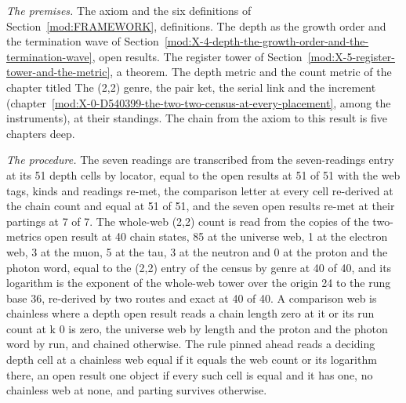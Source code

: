 \begin{chproof}
\textit{The premises.} The axiom and the six definitions of Section~\ref{mod:FRAMEWORK}, definitions. The depth as the growth order and the termination wave of Section~\ref{mod:X-4-depth-the-growth-order-and-the-termination-wave}, open results. The register tower of Section~\ref{mod:X-5-register-tower-and-the-metric}, a theorem. The depth metric and the count metric of the chapter titled The (2,2) genre, the pair ket, the serial link and the increment (chapter~\ref{mod:X-0-D540399-the-two-two-census-at-every-placement}, among the instruments), at their standings. The chain from the axiom to this result is five chapters deep.

\textit{The procedure.} The seven readings are transcribed from the seven-readings entry at its 51 depth cells by locator, equal to the open results at 51 of 51 with the web tags, kinds and readings re-met, the comparison letter at every cell re-derived at the chain count and equal at 51 of 51, and the seven open results re-met at their partings at 7 of 7. The whole-web (2,2) count is read from the copies of the two-metrics open result at 40 chain states, 85 at the universe web, 1 at the electron web, 3 at the muon, 5 at the tau, 3 at the neutron and 0 at the proton and the photon word, equal to the (2,2) entry of the census by genre at 40 of 40, and its logarithm is the exponent of the whole-web tower over the origin 24 to the rung base 36, re-derived by two routes and exact at 40 of 40. A comparison web is chainless where a depth open result reads a chain length zero at it or its run count at k 0 is zero, the universe web by length and the proton and the photon word by run, and chained otherwise. The rule pinned ahead reads a deciding depth cell at a chainless web equal if it equals the web count or its logarithm there, an open result one object if every such cell is equal and it has one, no chainless web at none, and parting survives otherwise.


\end{chproof}
